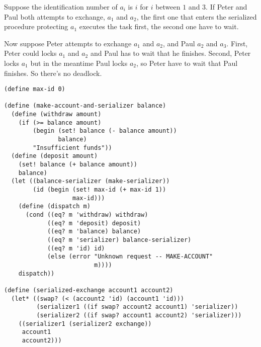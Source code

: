 \documentclass[a4paper,12pt]{article}
\begin{document}
Suppose the identification number of $a_i$ is $i$ for $i$ between $1$
and $3$.  If Peter and Paul both attempts to exchange, $a_1$ and
$a_2$, the first one that enters the serialized procedure protecting
$a_1$ executes the task first, the second one have to wait.

Now suppose Peter attempts to exchange $a_1$ and $a_2$, and Paul
$a_2$ and $a_3$. First, Peter could locks $a_1$ and $a_2$ and Paul has
to wait that he finishes.  Second, Peter locks $a_1$ but in the
meantime Paul locks $a_2$,  so Peter have to wait that Paul finishes.
So there's no deadlock.
\begin{lstlisting}
(define max-id 0)

(define (make-account-and-serializer balance)
  (define (withdraw amount)
    (if (>= balance amount)
        (begin (set! balance (- balance amount))
               balance)
        "Insufficient funds"))
  (define (deposit amount)
    (set! balance (+ balance amount))
    balance)
  (let ((balance-serializer (make-serializer))
        (id (begin (set! max-id (+ max-id 1))
                   max-id)))
    (define (dispatch m)
      (cond ((eq? m 'withdraw) withdraw)
            ((eq? m 'deposit) deposit)
            ((eq? m 'balance) balance)
            ((eq? m 'serializer) balance-serializer)
            ((eq? m 'id) id)
            (else (error "Unknown request -- MAKE-ACCOUNT"
                         m))))
    dispatch))

(define (serialized-exchange account1 account2)
  (let* ((swap? (< (account2 'id) (account1 'id)))
         (serializer1 ((if swap? account2 account1) 'serializer))
         (serializer2 ((if swap? account1 account2) 'serializer)))
    ((serializer1 (serializer2 exchange))
     account1
     account2)))
\end{lstlisting}
\end{document}
